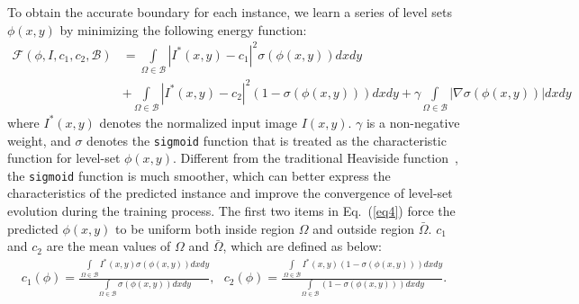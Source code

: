 \documentclass[12pt,onecolumn,letterpaper]{article}
\begin{document}
To obtain the accurate boundary for each instance, we learn a series of level sets $\phi(x,y)$ by minimizing the following energy function:
\begin{equation} \label{eq4}
	\begin{aligned}
		\mathcal{F}(\phi ,I, {c_1},{c_2},\mathcal{B}) &=  \int\limits_{\Omega  \in \mathcal{B}} {{{\left| {{I^*}(x,y) - c_1} \right|}^2}\sigma (\phi (x,y))} dxdy \\ & +  \int\limits_{\Omega  \in \mathcal{B}} {{{\left| {{I^*}(x,y) - c_2} \right|}^2}(1 - \sigma (\phi (x,y)))} dxdy  +  \gamma \int\limits_{\Omega  \in \mathcal{B}} {\left| {\nabla \sigma (\phi (x,y))} \right|dxdy} 
	\end{aligned}
\end{equation}
where $I^*(x,y)$ denotes the normalized input image $I(x,y)$.
$\gamma$ is a non-negative weight, and
$\sigma$ denotes the \texttt{sigmoid} function that is treated as the characteristic function for level-set $\phi(x,y)$.  Different from the traditional Heaviside function~\cite{tip2001_active_contour}, the \texttt{sigmoid} function is much smoother, which can better express the characteristics of the predicted instance and improve the convergence of level-set evolution during the training process. The first two items in Eq.~(\ref{eq4}) force the predicted $\phi(x,y)$
to be uniform both inside region $\Omega$ and outside region
$\bar{\Omega}$. $c_1$ and $c_2$ are the mean values of $\Omega$ and $\bar{\Omega}$, which are defined as below:
\begin{equation} \label{eq5}
	\begin{aligned}
		c_1(\phi ) = \frac{{\int\limits_{\Omega  \in \mathcal{B}} {{I^*}(x,y)\sigma (\phi (x,y))} dxdy}}{{\int\limits_{\Omega  \in \mathcal{B}} {\sigma (\phi (x,y))} dxdy}},  \ \ \
	    c_2(\phi ) = \frac{{\int\limits_{\Omega  \in \mathcal{B}} {{I^*}(x,y)(1 - \sigma (\phi (x,y)))} dxdy}}{{\int\limits_{\Omega  \in \mathcal{B}} {(1 - \sigma (\phi (x,y)))} dxdy}}.
	\end{aligned}
\end{equation}
\end{document}
